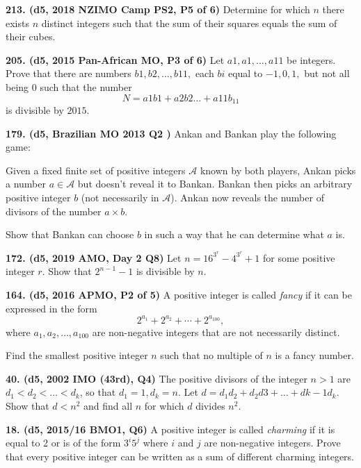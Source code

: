 \documentclass{article}
\begin{document}
\textbf{213. (\color{red}d5\color{black}, 2018 NZIMO Camp PS2, P5 of 6)} Determine for which \(n\) there exists \(n\) distinct integers such that the sum of their squares equals the sum of their cubes.

\textbf{205. (\color{red}d5\color{black}, 2015 Pan-African MO, P3 of 6)} Let $a{1}, a{1}, \dots, a{11}$ be integers. Prove that there are numbers $b{1}, b{2}, \dots, b{11},$ each $b{i}$ equal to $-1, 0, 1,$ but not all being $0$ such that the number $$N = a{1}b{1} + a{2}b{2} \dots + a{11}b_{11}$$ is divisible by $2015.$

\textbf{179. (\color{red}d5\color{black}, Brazilian MO 2013 Q2 )} Ankan and Bankan play the following game:



Given a fixed finite set of positive integers $\mathcal{A}$ known by both players, Ankan picks a number $a \in \mathcal{A}$ but doesn't reveal it to Bankan. Bankan then picks an arbitrary positive integer $b$ (not necessarily in $\mathcal{A}$). Ankan now reveals the number of divisors of the number $a \times b$.



Show that Bankan can choose $b$ in such a way that he can determine what $a$ is.

\textbf{172. (\color{red}d5\color{black}, 2019 AMO, Day 2 Q8)} Let $n = 16^{3^r} - 4^{3^r} + 1$ for some positive integer $r$. Show that $2^{n-1}-1$ is divisible by $n$.

\textbf{164. (\color{red}d5\color{black}, 2016 APMO, P2 of 5)} A positive integer is called \emph{fancy} if it can be expressed in the form \[2^{a_1} + 2^{a_2} + \cdots + 2^{a_{100}},\] where \(a_1 , a_2 , \dots, a_{100}\) are non-negative integers that are not necessarily distinct.



\makebox[1.5em]{} Find the smallest positive integer \(n\) such that no multiple of \(n\) is a fancy number.

\textbf{40. (\color{red}d5\color{black}, 2002 IMO (43rd), Q4)} The positive divisors of the integer $n > 1$ are  $d_1 < d_2 < \dots < d_k$, so that $d_1 = 1, d_k = n$. Let $d = d_1d_2 + d_2d3 + \dots + d{k-1}d_k$. Show that $d < n^2$ and find all $n$ for which $d$ divides $n^2$.

\textbf{18. (\color{red}d5\color{black}, 2015/16 BMO1, Q6)} A positive integer is called \emph{charming} if it is equal to 2 or is of the form $3^i5^j$ where $i$ and $j$ are non-negative integers. Prove that every positive integer can be written as a sum of different charming integers.
\end{document}

